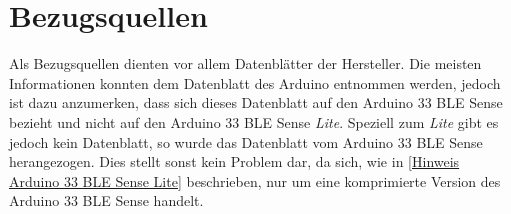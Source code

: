 \section{Bezugsquellen}

Als Bezugsquellen dienten vor allem Datenblätter der Hersteller. Die meisten Informationen konnten dem Datenblatt des Arduino entnommen werden, jedoch ist dazu anzumerken, dass sich dieses Datenblatt auf den Arduino 33 BLE Sense bezieht und nicht auf den Arduino 33 BLE Sense \emph{Lite}. Speziell zum \emph{Lite} gibt es jedoch kein Datenblatt, so wurde das Datenblatt vom Arduino 33 BLE Sense herangezogen. Dies stellt sonst kein Problem dar, da sich, wie in \ref{Hinweis Arduino 33 BLE Sense Lite} beschrieben, nur um eine komprimierte Version des Arduino 33 BLE Sense handelt.


